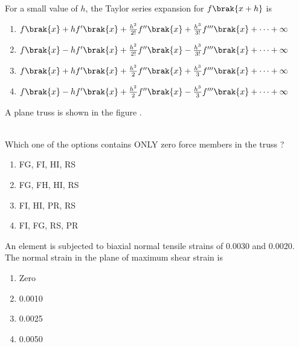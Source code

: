 \iffalse
\chapter{2019}
\author{AI24BTECH11009}
\section{ce}
\fi

\item For a small value of $h$, the Taylor series expansion for $f\brak{x+h}$ is
\begin{enumerate}
    \item $f\brak{x} + hf'\brak{x} + \frac{h^2}{2!}f''\brak{x} + \frac{h^3}{3!}f'''\brak{x} + \cdots + \infty$
    \item $f\brak{x} - hf'\brak{x} + \frac{h^2}{2!}f''\brak{x} - \frac{h^3}{3!}f'''\brak{x} + \cdots + \infty$
    \item $f\brak{x} + hf'\brak{x} + \frac{h^2}{2}f''\brak{x} + \frac{h^3}{3}f'''\brak{x} + \cdots + \infty$
    \item $f\brak{x} - hf'\brak{x} + \frac{h^2}{2}f''\brak{x} - \frac{h^3}{3}f'''\brak{x} + \cdots + \infty$ \\
\end{enumerate}
\item A plane truss is shown in the figure .
\begin{figure}[!ht]
\centering
\resizebox{1\textwidth}{!}{%

}%
\end{figure}\\
Which one of the options contains ONLY zero force members in the truss ?
\begin{enumerate}
    \item FG, FI, HI, RS
    \item FG, FH, HI, RS
    \item FI, HI, PR, RS
    \item FI, FG, RS, PR \\
\end{enumerate}
\item An element is subjected to biaxial normal tensile strains of 0.0030 and 0.0020. The normal strain in the plane of maximum shear strain is
\begin{enumerate}
    \item Zero
    \item 0.0010
    \item 0.0025
    \item 0.0050 \\
\end{enumerate}
